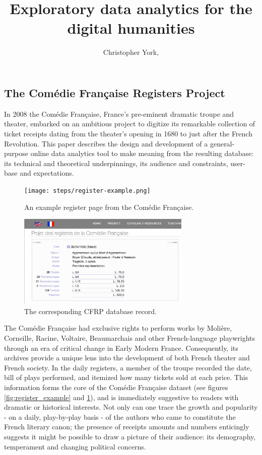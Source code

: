 \documentclass[	DIV=calc,%
							paper=a4,%
							fontsize=11pt,%
							twocolumn]{scrartcl}	 					%
\title{Exploratory data analytics for the digital humanities}					%
\author{Christopher York, }										%
\date{}																				%
\begin{document}
\maketitle
\thispagestyle{fancy} 			%

\subsection*{The Comédie Française Registers Project}

In 2008 the Comédie Française, France's pre-eminent dramatic troupe and theater, embarked on an ambitious project to digitize its remarkable collection of ticket receipts dating from the theater's opening in 1680 to just after the French Revolution.  This paper describes the design and development of a general-purpose online data analytics tool to make meaning from the resulting database: its technical and theoretical underpinnings, its audience and constraints, user-base and expectations.

\begin{figure}
  \centering
  \texttt{[image: steps/register-example.png]}
	\caption{An example register page from the Comédie Française.}
  \label{fig:register_example}
  \includegraphics[width=3.25in]{steps/register-example-digital.png}
	\caption{The corresponding CFRP database record.}
  \label{fig:register_example_digital}
\end{figure}

The Comédie Française had exclusive rights to perform works by Molière, Corneille, Racine, Voltaire, Beaumarchais and other French-language playwrights through an era of critical change in Early Modern France.  Consequently, its archives provide a unique lens into the development of both French theater and French society.  In the daily registers, a member of the troupe recorded the date, bill of plays performed, and itemized how many tickets sold at each price.  This information forms the core of the Comédie Française dataset (see figures \ref{fig:register_example} and \ref{fig:register_example_digital}), and is immediately suggestive to readers with  dramatic or historical interests.  Not only can one trace the growth and popularity - on a daily, play-by-play basis - of the authors who came to constitute the French literary canon; the presence of receipts amounts and numbers enticingly suggests it might be possible to draw a picture of their audience: its demography, temperament and changing political concerns.
\end{document}
